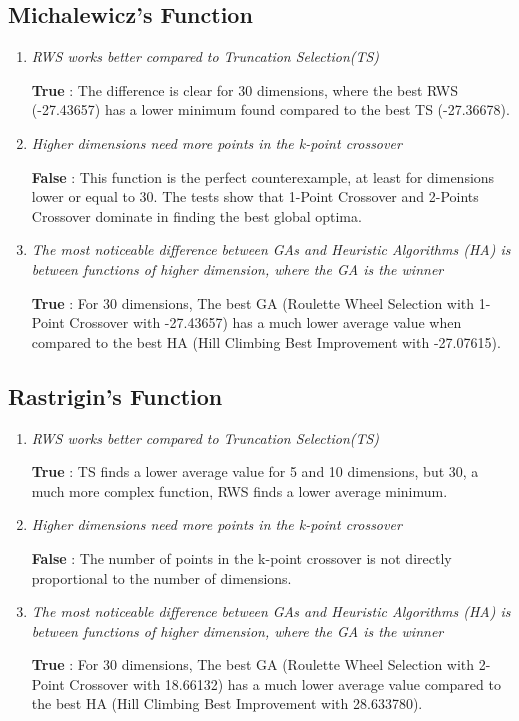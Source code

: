 \documentclass{article}
\begin{document}
\subsection{Michalewicz’s Function}
\begin{enumerate}
    \item \textit{RWS works better compared to Truncation Selection(TS)}
    
    \textbf{True} : The difference is clear for 30 dimensions, where the best RWS (-27.43657) has a lower
minimum found compared to the best TS (-27.36678).
    
    \item \textit{Higher dimensions need more points in the k-point crossover}
    
    \textbf{False} : This function is the perfect counterexample, at least for dimensions lower or equal to 30. The tests show that 1-Point Crossover and 2-Points Crossover dominate in finding the best
global optima.

    \item \textit{The most noticeable difference between GAs and  Heuristic Algorithms (HA) is between functions of higher dimension, where the GA is the winner}
    
    \textbf{True} : For 30 dimensions, The best GA (Roulette Wheel Selection with 1-Point Crossover with
-27.43657) has a much lower average value when compared to the best HA (Hill Climbing Best
Improvement with -27.07615).
    
    
\end{enumerate}

\newpage
\subsection{Rastrigin’s Function}
\begin{enumerate}
    \item \textit{RWS works better compared to Truncation Selection(TS)}
    
    \textbf{True} : TS finds a lower average value for 5 and 10 dimensions, but 30, a much more complex function, RWS finds a lower average minimum.
    
    \item \textit{Higher dimensions need more points in the k-point crossover}
    
    \textbf{False} : The number of points in the k-point crossover is not directly proportional to the number of dimensions.

    \item \textit{The most noticeable difference between GAs and  Heuristic Algorithms (HA) is between functions of higher dimension, where the GA is the winner}
    
    \textbf{True} : For 30 dimensions, The best GA (Roulette Wheel Selection with 2-Point Crossover with 18.66132) has a much lower average value compared to the best HA (Hill Climbing Best Improvement with 28.633780).
    
\end{enumerate}
\end{document}
